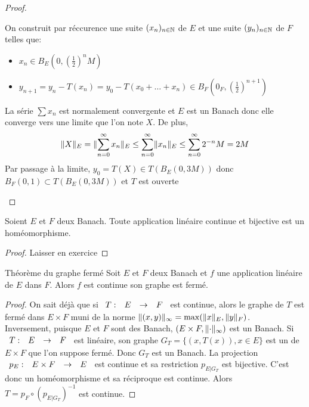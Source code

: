 \documentclass[]{report}
\begin{document}
\begin{proof}
\begin{enumerate}
            On construit par réccurence une suite $(x_n)_{n\in\mathbb{N}}$ de $E$ et une suite $(y_n)_{n\in \mathbb{N}}$ de $F$ telles que:
            \begin{itemize}
                \item $x_n\in B_E(0,\left(\frac{1}{2}\right)^nM)$
                \item $y_{n+1}=y_n-T(x_n)=y_0-T(x_0+\ldots+x_n)\in B_F(0_F,\left(\frac{1}{2}\right)^{n+1})$
            \end{itemize}
            La série $\sum x_n$ est normalement convergente et $E$ est un Banach donc elle converge vers une limite que l'on note $X$. De plus,
            \[\lVert X \rVert_E=\lVert \sum_{n=0}^{\infty}x_n \rVert_E\le \sum_{n=0}^{\infty}\lVert x_n \rVert_E\le \sum_{n=0}^{\infty}2^{-n}M=2M\]
            Par passage à la limite, $y_0=T(X)\in T(B_E(0,3M))$ donc $B_F(0,1)\subset T(B_E(0,3M))$ et $T$ est ouverte
        \end{enumerate}
    \end{proof}

    \begin{cor}{}{}
        Soient $E$ et $F$ deux Banach. Toute application linéaire continue et bijective est un homéomorphisme.
    \end{cor}

    \begin{proof}
        Laisser en exercice
    \end{proof}

    \begin{tm}{Théorème du graphe fermé}{}
        Soit $E$ et $F$ deux Banach et $f$ une application linéaire de $E$ dans $F$. Alors $f$ est continue \ssi son graphe est fermé.
    \end{tm}

    \begin{proof}
        On sait déjà que si $\begin{array}{ccccc} T : & E & \to & F \end{array}$ est continue, alors le graphe de $T$ est fermé dans $E\times F$ muni de la norme $\lVert (x,y) \rVert_\infty=\max(\lVert x \rVert_E,\lVert y \rVert_F)$.\\
        Inversement, puisque $E$ et $F$ sont des Banach, $(E\times F,\lVert \cdot \rVert_\infty)$ est un Banach. Si $\begin{array}{ccccc} T : & E & \to & F \end{array}$ est linéaire, son graphe $G_T=\{(x,T(x)),x\in E\}$ est un \sev de $E\times F$ que l'on suppose fermé. Donc $G_T$ est un Banach. La projection $\begin{array}{ccccc} p_E : & E\times F & \to & E \end{array}$ est continue et sa restriction $p_{E|G_T}$ est bijective. C'est donc un homéomorphisme et sa réciproque est continue. Alors $T=p_F\circ\left(p_{E|G_T}\right)^{-1}$ est continue.
    \end{proof}
\end{document}
